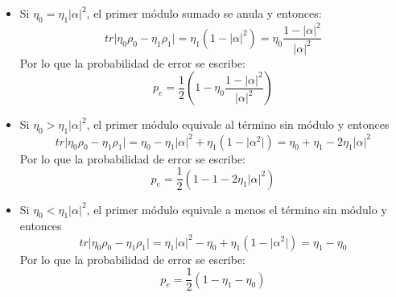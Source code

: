 \documentclass{book}
\begin{document}
\begin{itemize}
    \item Si ${\eta_0=\eta_1\lvert\alpha\rvert^2}$, el primer módulo sumado se anula y entonces:
    \begin{equation}{tr\lvert\eta_0\rho_0-\eta_1\rho_1\rvert= \eta_1(1-\lvert\alpha\rvert^2)=\eta_0\frac{1-\lvert\alpha\rvert^2}{\lvert\alpha\rvert^2}}\end{equation}
    Por lo que la probabilidad de error se escribe:
    \begin{equation}{p_e=\frac{1}{2}(1-\eta_0\frac{1-\lvert\alpha\rvert^2}{\lvert\alpha\rvert^2})}\end{equation}
    \item Si ${\eta_0>\eta_1\lvert\alpha\rvert^2}$, el primer módulo equivale al término sin módulo y entonces
    \begin{equation}{tr\lvert \eta_0\rho_0-\eta_1\rho_1\rvert=\eta_0-\eta_1\lvert{\alpha}\rvert^2+\eta_1 (1-\lvert\alpha^2\rvert)=\eta_0+\eta_1-2\eta_1\lvert\alpha\rvert^2}\end{equation}
        Por lo que la probabilidad de error se escribe:
    \begin{equation}{p_e=\frac{1}{2}(1-1-2\eta_1\lvert\alpha\rvert^2)}\end{equation}
    \item Si ${\eta_0<\eta_1\lvert\alpha\rvert^2}$,  el primer módulo equivale a menos el término sin módulo y entonces
    \begin{equation}{tr\lvert\eta_0\rho_0-\eta_1\rho_1\rvert= \eta_1\lvert{\alpha}\rvert^2-\eta_0+ \eta_1 (1-\lvert\alpha^2\rvert)=\eta_1-\eta_0 }\end{equation}
        Por lo que la probabilidad de error se escribe:
    \begin{equation}{p_e=\frac{1}{2}(1-\eta_1-\eta_0)}\end{equation}
\end{itemize}
\end{document}

